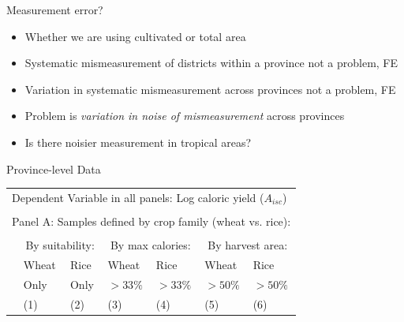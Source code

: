 \documentclass[10pt, xcolor=dvipsnames]{beamer}
\begin{document}
\begin{frame}{Measurement error?}
\begin{itemize}
  \item Whether we are using cultivated or total area
  \item Systematic mismeasurement of districts within a province not a problem, FE
  \item Variation in systematic mismeasurement across provinces not a problem, FE
  \item Problem is \textit{variation in noise of mismeasurement} across provinces
  \item Is there noisier measurement in tropical areas? 
\end{itemize}
\end{frame}


\begin{frame}{Province-level Data}\label{regprov}

{\footnotesize
\begin{tabularx}{\textwidth}{lXXXXXX}
\midrule
\multicolumn{7}{l}{Dependent Variable in all panels: Log caloric yield ($A_{isc}$)} \\ \\
\multicolumn{7}{l}{Panel A: Samples defined by crop family (wheat vs. rice):} \\ \\
 & \multicolumn{2}{c}{By suitability:} & \multicolumn{2}{c}{By max calories:} & \multicolumn{2}{c}{By harvest area:}\\ \cmidrule(lr){2-3} \cmidrule(lr){4-5} \cmidrule(lr){6-7} 
 & Wheat & Rice & Wheat  & Rice  & Wheat  & Rice \\
 & Only & Only &  $>33\%$ & $>33\%$ & $>50\%$ & $>50\%$   \\
 & (1) & (2) & (3) & (4) & (5) & (6) \\
\midrule

\midrule
\end{tabularx}
}

\hfill \hyperlink{robustness}{}
\end{frame}
\end{document}
